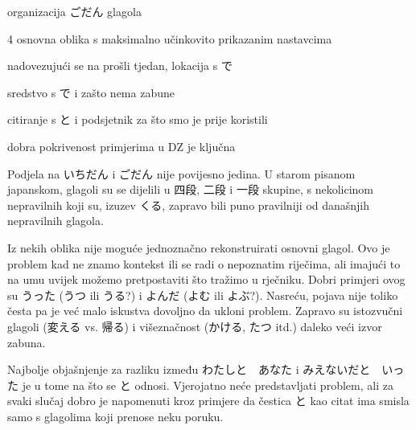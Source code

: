 
\author{Tomislav Mamić}

	
	
	\vspace{-10pt}
	\begin{hyou}
		\item organizacija ごだん glagola
		\item 4 osnovna oblika s maksimalno učinkovito prikazanim nastavcima
		\item nadovezujući se na prošli tjedan, lokacija s で
		\item sredstvo s で i zašto nema zabune
		\item citiranje s と i podsjetnik za što smo je prije koristili
		\item dobra pokrivenost primjerima u DZ je ključna
	\end{hyou}

	
	Podjela na いちだん i ごだん nije povijesno jedina. U starom pisanom japanskom, glagoli su se dijelili u 四段, 二段 i 一段 skupine, s nekolicinom nepravilnih koji su, izuzev くる, zapravo bili puno pravilniji od današnjih nepravilnih glagola.
	
	Iz nekih oblika nije moguće jednoznačno rekonstruirati osnovni glagol. Ovo je problem kad ne znamo kontekst ili se radi o nepoznatim riječima, ali imajući to na umu uvijek možemo pretpostaviti što tražimo u rječniku. Dobri primjeri ovog su うった (うつ ili うる?) i よんだ (よむ ili よぶ?). Nasreću, pojava nije toliko česta pa je već malo iskustva dovoljno da ukloni problem. Zapravo su istozvučni glagoli (変える vs. 帰る) i višeznačnost (かける, たつ itd.) daleko veći izvor zabuna.
	
	Najbolje objašnjenje za razliku između わたしと　あなた i みえないだと　いった je u tome na što se と odnosi. Vjerojatno neće predstavljati problem, ali za svaki slučaj dobro je napomenuti kroz primjere da čestica と kao citat ima smisla samo s glagolima koji prenose neku poruku.
